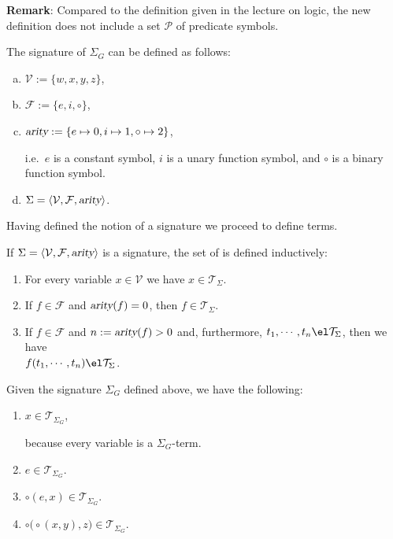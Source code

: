 \noindent
\textbf{Remark}:  Compared to the definition given in the lecture on logic,
the new definition does not include a set $\mathcal{P}$ of predicate symbols.
\vspace*{0.2cm}

\example
The signature of  $\Sigma_G$ can be defined as follows:
\begin{enumerate}[(a)]
\item $\mathcal{V} := \{ w, x, y, z \}$,
\item $\mathcal{F} := \{ e, i, \circ \}$,
\item $\textsl{arity} := \{ e \mapsto 0, i \mapsto 1, \circ \mapsto 2 \}$,
  
      i.e.~$e$ is a constant symbol, $i$ is a unary function symbol, and $\circ$ is a binary function symbol.
\item $\Sigma = \langle \mathcal{V}, \mathcal{F}, \textsl{arity} \rangle$. \eoxs
\end{enumerate}

\noindent
Having defined the notion of a signature we proceed to define terms.

\begin{Definition}
  If $\Sigma = \langle \mathcal{V}, \mathcal{F}, \textsl{arity} \rangle$ is a signature, the set of
     
   is defined inductively:
  \begin{enumerate}
  \item For every variable $x \in \mathcal{V}$ we have $x \in \mathcal{T}_\Sigma$.
  \item If $f \in \mathcal{F}$ and $\textsl{arity}(f) = 0$, then $f \in \mathcal{T}_\Sigma$.
  \item If $f \in \mathcal{F}$ and $n := \textsl{arity}(f) > 0$ and, furthermore, $t_1,\cdots,t_n \el \mathcal{T}_\Sigma$,  then we have
        \\[0.2cm]
        \hspace*{1.3cm} $f(t_1,\cdots,t_n) \el \mathcal{T}_\Sigma$.
        \eoxs
  \end{enumerate}
\end{Definition}

\example
Given the signature $\Sigma_G$ defined above, we have the following:
\begin{enumerate}
\item $x \in \mathcal{T}_{\Sigma_G}$,
  
      because every variable is a $\Sigma_{G}$-term.
\item $e \in \mathcal{T}_{\Sigma_G}$.
\item $\circ(e,x) \in \mathcal{T}_{\Sigma_G}$.
\item $\circ\bigl(\circ(x,y),z\bigr) \in \mathcal{T}_{\Sigma_G}$.
\end{enumerate}

